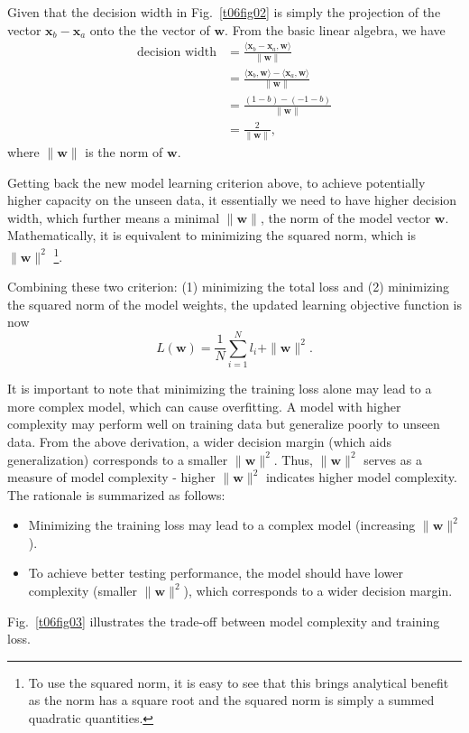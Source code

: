 \documentclass[12pt]{article}
\begin{document}
Given that the decision width in Fig.~\ref{t06fig02} is simply the projection of the vector $\bm{x}_b - \bm{x}_a$ onto the the vector of $\bm{w}$. From the basic linear algebra, we have
\begin{equation}
\begin{split}
\text{decision width} &= \frac{\langle \bm{x}_b - \bm{x}_a, \bm{w} \rangle}{\|\bm{w}\|}\\[1mm]
                      &= \frac{\langle \bm{x}_b, \bm{w} \rangle - \langle \bm{x}_a, \bm{w} \rangle}{\|\bm{w}\|}\\[1mm]
                      &= \frac{(1 - b) - (-1 - b)}{\|\bm{w}\|}\\[1mm]
                      &= \frac{2}{\|\bm{w}\|},
\end{split}
\label{t06eq02}
\end{equation}
where $\|\bm{w}\|$ is the norm of $\bm{w}$. 

Getting back the new model learning criterion above, to achieve potentially higher capacity on the unseen data, it essentially we need to have higher decision width, which further means a minimal  $\|\bm{w}\|$, the norm of the model vector $\bm{w}$. Mathematically, it is equivalent to minimizing the squared norm, which is $\|\bm{w}\|^2$ \footnote{To use the squared norm, it is easy to see that this brings analytical benefit as the norm has a square root and the squared norm is simply a summed quadratic quantities.}. 

Combining these two criterion: (1) minimizing the total loss and  (2) minimizing the squared norm of the model weights, the updated learning objective function is now
\begin{equation}
L(\bm{w}) = \frac{1}{N}\sum_{i=1}^N l_i + \|\bm{w}\|^2.
\label{t06eq03}
\end{equation}

It is important to note that minimizing the training loss alone may lead to a more complex model, which can cause overfitting. A model with higher complexity may perform well on training data but generalize poorly to unseen data. From the above derivation, a wider decision margin (which aids generalization) corresponds to a smaller $\|\bm{w}\|^2$. Thus, $\|\bm{w}\|^2$ serves as a measure of model complexity - higher $\|\bm{w}\|^2$ indicates higher model complexity. The rationale is summarized as follows:
\begin{itemize}
    \item Minimizing the training loss may lead to a complex model (increasing $\|\bm{w}\|^2$).
    \item To achieve better testing performance, the model should have lower complexity (smaller $\|\bm{w}\|^2$), which corresponds to a wider decision margin.
\end{itemize}
Fig.~\ref{t06fig03} illustrates the trade-off between model complexity and training loss.
\end{document}
